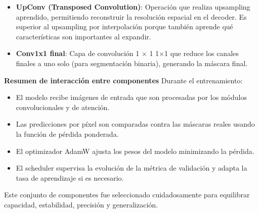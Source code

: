 \begin{enumerate}
\begin{itemize}
\begin{itemize}
\item \textbf{UpConv (Transposed Convolution)}:
Operación que realiza upsampling aprendido, permitiendo reconstruir la resolución espacial en el decoder. Es superior al upsampling por interpolación porque también aprende qué características son importantes al expandir.

\item \textbf{Conv1x1 final}:
Capa de convolución 
1
×
1
1×1 que reduce los canales finales a uno solo (para segmentación binaria), generando la máscara final.
\end{itemize}



\textbf{Resumen de interacción entre componentes}
Durante el entrenamiento:
\begin{itemize}
\item El modelo recibe imágenes de entrada que son procesadas por los módulos convolucionales y de atención.
\item Las predicciones por píxel son comparadas contra las máscaras reales usando la función de pérdida ponderada.
\item El optimizador AdamW ajusta los pesos del modelo minimizando la pérdida.
\item El scheduler supervisa la evolución de la métrica de validación y adapta la tasa de aprendizaje si es necesario.
\end{itemize}

Este conjunto de componentes fue seleccionado cuidadosamente para equilibrar capacidad, estabilidad, precisión y generalización.


\end{itemize}
\end{enumerate}
